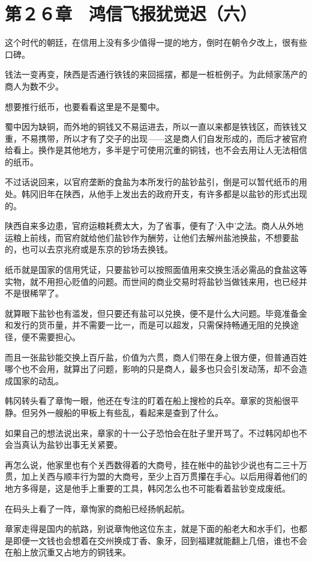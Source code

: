 \section{第２６章　鸿信飞报犹觉迟（六）}

这个时代的朝廷，在信用上没有多少值得一提的地方，倒时在朝令夕改上，很有些口碑。

钱法一变再变，陕西是否通行铁钱的来回摇摆，都是一桩桩例子。为此倾家荡产的商人为数不少。

想要推行纸币，也要看看这里是不是蜀中。

蜀中因为缺铜，而外地的铜钱又不易运进去，所以一直以来都是铁钱区，而铁钱又重，不易携带，所以才有了交子的出现——这是商人们自发形成的，而后才被官府给看上。换作是其他地方，多半是宁可使用沉重的铜钱，也不会去用让人无法相信的纸币。

不过话说回来，以官府垄断的食盐为本所发行的盐钞盐引，倒是可以暂代纸币的用处。韩冈旧年在陕西，从他手上发出去的政府开支，有许多都是以盐钞的形式出现的。

陕西自来多边患，官府运粮耗费太大，为了省事，便有了‘入中’之法。商人从外地运粮上前线，而官府就给他们盐钞作为酬劳，让他们去解州盐池换盐，不想要盐的，也可以去京兆府或是东京的钞场去换钱。

纸币就是国家的信用凭证，只要盐钞可以按照面值用来交换生活必需品的食盐这等实物，就不用担心贬值的问题。而世间的商业交易时将盐钞当做钱来用，也已经并不是很稀罕了。

就算眼下盐钞也有滥发，但只要还有盐可以兑换，便不是什么大问题。毕竟准备金和发行的货币量，并不需要一比一，而是可以超发，只需保持畅通无阻的兑换途径，便不需要担心。

而且一张盐钞能交换上百斤盐，价值为六贯，商人们带在身上很方便，但普通百姓哪个也不会用，就算出了问题，影响的只是商人，最多也只会引发动荡，却不会造成国家的动乱。

韩冈转头看了章恂一眼，他还在专注的盯着在船上搜检的兵卒。章家的货船很平静。但另外一艘船的甲板上有些乱，看起来是查到了什么。

如果自己的想法说出来，章家的十一公子恐怕会在肚子里开骂了。不过韩冈却也不会当真认为盐钞出事无关紧要。

再怎么说，他家里也有个关西数得着的大商号，挂在帐中的盐钞少说也有二三十万贯，加上关西与顺丰行为盟的大商号，至少上百万贯攥在手心。以后用得着他们的地方多得是，这是他手上重要的工具，韩冈怎么也不可能看着盐钞变成废纸。

在码头上看了一阵，章恂家的商船已经扬帆起航。

章家走得是国内的航路，别说章恂他这位东主，就是下面的船老大和水手们，也都是即便一文钱也会想着在交州换成丁香、象牙，回到福建就能翻上几倍，谁也不会在船上放沉重又占地方的铜钱来。


